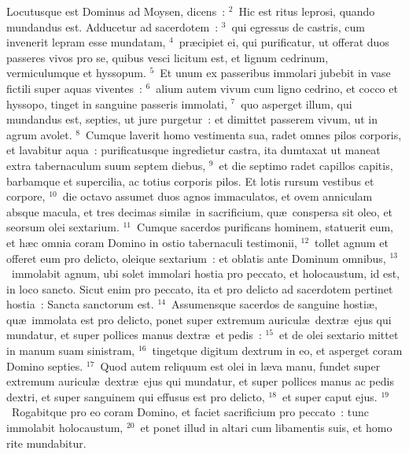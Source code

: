 \lettrine[lines=3,image=true,loversize=0.05,lraise=-0.03]{L}{}ocutusque est Dominus ad Moysen, dicens~:
${}^{2}$~Hic est ritus leprosi, quando mundandus est. Adducetur ad sacerdotem~:
${}^{3}$~qui egressus de castris, cum invenerit lepram esse mundatam,
${}^{4}$~pr\ae cipiet ei, qui purificatur, ut offerat duos passeres vivos pro se, quibus vesci licitum est, et lignum cedrinum, vermiculumque et hyssopum.
${}^{5}$~Et unum ex passeribus immolari jubebit in vase fictili super aquas viventes~:
${}^{6}$~alium autem vivum cum ligno cedrino, et cocco et hyssopo, tinget in sanguine passeris immolati,
${}^{7}$~quo asperget illum, qui mundandus est, septies, ut jure purgetur~: et dimittet passerem vivum, ut in agrum avolet.
${}^{8}$~Cumque laverit homo vestimenta sua, radet omnes pilos corporis, et lavabitur aqua~: purificatusque ingredietur castra, ita dumtaxat ut maneat extra tabernaculum suum septem diebus,
${}^{9}$~et die septimo radet capillos capitis, barbamque et supercilia, ac totius corporis pilos. Et lotis rursum vestibus et corpore,
${}^{10}$~die octavo assumet duos agnos immaculatos, et ovem anniculam absque macula, et tres decimas simil\ae\ in sacrificium, qu\ae\ conspersa sit oleo, et seorsum olei sextarium.
${}^{11}$~Cumque sacerdos purificans hominem, statuerit eum, et h\ae c omnia coram Domino in ostio tabernaculi testimonii,
${}^{12}$~tollet agnum et offeret eum pro delicto, oleique sextarium~: et oblatis ante Dominum omnibus,
${}^{13}$~immolabit agnum, ubi solet immolari hostia pro peccato, et holocaustum, id est, in loco sancto. Sicut enim pro peccato, ita et pro delicto ad sacerdotem pertinet hostia~: Sancta sanctorum est.
${}^{14}$~Assumensque sacerdos de sanguine hosti\ae , qu\ae\ immolata est pro delicto, ponet super extremum auricul\ae\ dextr\ae\ ejus qui mundatur, et super pollices manus dextr\ae\ et pedis~:
${}^{15}$~et de olei sextario mittet in manum suam sinistram,
${}^{16}$~tingetque digitum dextrum in eo, et asperget coram Domino septies.
${}^{17}$~Quod autem reliquum est olei in l\ae va manu, fundet super extremum auricul\ae\ dextr\ae\ ejus qui mundatur, et super pollices manus ac pedis dextri, et super sanguinem qui effusus est pro delicto,
${}^{18}$~et super caput ejus.
${}^{19}$~Rogabitque pro eo coram Domino, et faciet sacrificium pro peccato~: tunc immolabit holocaustum,
${}^{20}$~et ponet illud in altari cum libamentis suis, et homo rite mundabitur.


